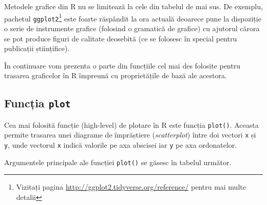 \documentclass[]{article}
\let\rmarkdownfootnote\footnote%
\def\footnote{\protect\rmarkdownfootnote}
\newcounter{exo}[section]
\begin{document}
Metodele grafice din R nu se limitează la cele din tabelul de mai sus.
De exemplu, pachetul \texttt{ggplot2}\footnote{Vizitați pagina
  \url{http://ggplot2.tidyverse.org/reference/} pentru mai multe detalii}
este foarte răspândit la ora actuală deoarece pune la dispoziție o serie
de instrumente grafice (folosind o gramatică de grafice) cu ajutorul
cărora se pot produce figuri de calitate deosebită (ce se folosesc în
special pentru publicații științifice).

În continuare vom prezenta o parte din funcțiile cel mai des folosite
pentru trasarea graficelor în R împreună cu proprietățile de bază ale
acestora.

\subsection{\texorpdfstring{Funcția
\texttt{plot}}{Funcția plot}}\label{functia-plot}

Cea mai folosită funcție (high-level) de plotare în R este funcția
\texttt{plot()}. Aceasta permite trasarea unei diagrame de împrăștiere
(\emph{scatterplot}) între doi vectori \texttt{x} și \texttt{y}, unde
vectorul \texttt{x} indică valorile pe axa abscisei iar \texttt{y} pe
axa ordonatelor.

Argumentele principale ale funcției \texttt{plot()} se găsesc în tabelul
următor.
\end{document}
